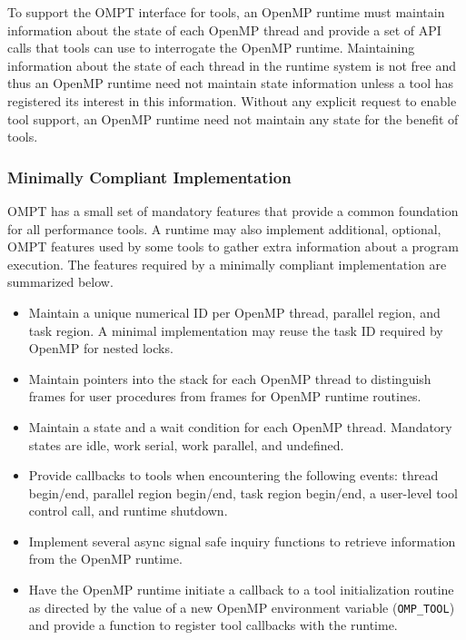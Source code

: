 \documentclass{article}
\begin{document}
To support the OMPT interface for tools, an OpenMP runtime must maintain information about the state of each OpenMP thread and provide a set of API calls that tools can use to interrogate the OpenMP runtime. Maintaining information about the state of each thread in the runtime system is not free and thus an OpenMP runtime need not maintain state information unless a tool has registered its interest in this information.
Without any explicit request to enable tool support, an OpenMP runtime need not maintain any state for the benefit of tools.

\subsubsection{Minimally Compliant Implementation}

OMPT has a small set of mandatory features that provide a common foundation for all performance tools. A runtime may also implement additional, optional, OMPT features used by some tools to gather extra information about a program execution.     
The features required by a minimally compliant implementation are summarized below.

\begin{itemize}
\item Maintain a unique numerical ID per OpenMP thread, parallel region, and task region. A minimal implementation may reuse the task ID required by OpenMP for nested locks.
\item Maintain pointers into the stack for each OpenMP thread to distinguish frames for user procedures from frames for OpenMP runtime routines.  
\item Maintain a state and a wait condition for each OpenMP thread. Mandatory states are idle, work serial, work parallel, and undefined.
\item Provide callbacks to tools when encountering the following  events:  thread begin/end, parallel region begin/end, task region begin/end, a user-level tool control call, and runtime shutdown.
\item Implement several async signal safe inquiry functions to retrieve information from the OpenMP runtime.
\item Have the OpenMP runtime initiate a callback to a tool initialization routine 
as directed by the value of a new OpenMP environment variable (\verb|OMP_TOOL|) and provide a function to register tool callbacks with the runtime.
\end{itemize}
\end{document}
